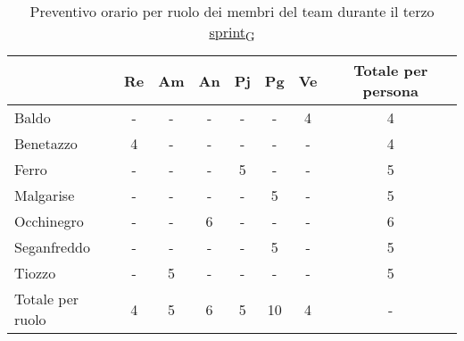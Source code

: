 \begin{table}[!h]
	\centering
	\begin{tabular}{ | l | c | c | c | c | c | c | c | }
		\hline
		\textbf{}        & \textbf{Re} & \textbf{Am} & \textbf{An} & \textbf{Pj} & \textbf{Pg} & \textbf{Ve} & \textbf{Totale per persona} \\
		\hline
		Baldo            & -           & -           & -           & -           & -           & 4           & 4                           \\
		Benetazzo        & 4           & -           & -           & -           & -           & -           & 4                           \\
		Ferro            & -           & -           & -           & 5           & -           & -           & 5                           \\
		Malgarise        & -           & -           & -           & -           & 5           & -           & 5                           \\
		Occhinegro       & -           & -           & 6           & -           & -           & -           & 6                           \\
		Seganfreddo      & -           & -           & -           & -           & 5           & -           & 5                           \\
		Tiozzo           & -           & 5           & -           & -           & -           & -           & 5                           \\
		\hline
		Totale per ruolo & 4           & 5           & 6           & 5           & 10          & 4           & -                           \\
		\hline
	\end{tabular}
	\caption{Preventivo orario per ruolo dei membri del team durante il terzo \href{https://7last.github.io/docs/pb/documentazione-interna/glossario\#sprint}{sprint\textsubscript{G}}}
	
\end{table}

